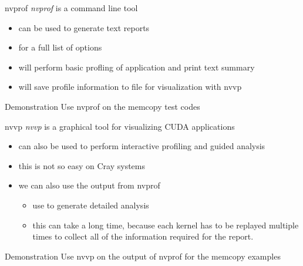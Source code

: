 \begin{frame}[fragile]{}
    \begin{info}{nvprof}
        \emph{nvprof} is a command line tool
        \begin{itemize}
            \item can be used to generate text reports
            \item {} for a full list of options
            \item {} will perform basic profling of application and print text summary
            \item {} will save profile information to file  for visualization with nvvp
        \end{itemize}
    \end{info}

    \begin{info}{Demonstration}
        Use nvprof on the memcopy test codes
    \end{info}
\end{frame}


\begin{frame}[fragile]{}
    \begin{info}{nvvp}
        \emph{nvvp} is a graphical tool for visualizing CUDA applications
        \begin{itemize}
            \item can also be used to perform interactive profiling and guided analysis
            \item this is not so easy on Cray systems
            \item we can also use the output from nvprof
            \begin{itemize}
                \item use  to generate detailed analysis
                \item this can take a long time, because each kernel has to be replayed multiple times to collect all of the information required for the report.
            \end{itemize}
        \end{itemize}
    \end{info}

    \begin{info}{Demonstration}
        Use nvvp on the output of nvprof for the memcopy examples
    \end{info}
\end{frame}

